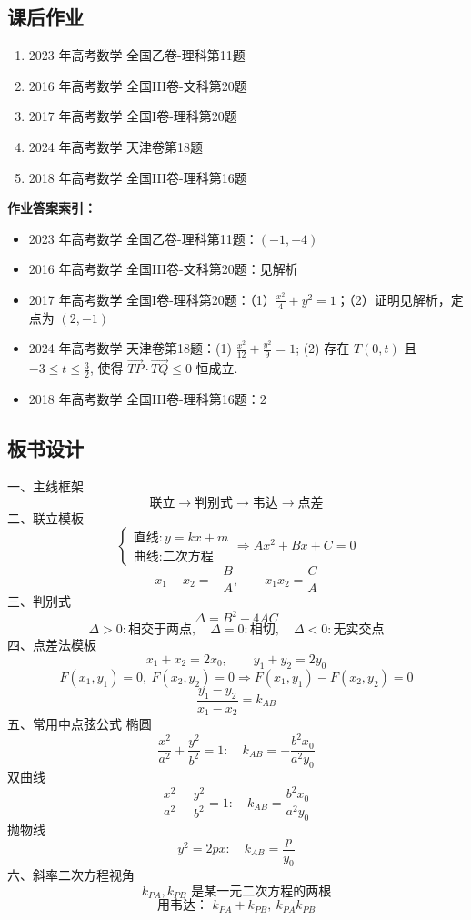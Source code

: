 \documentclass[UTF8,a4paper,11pt]{ctexart}
\begin{document}
\subsection*{课后作业}

\begin{enumerate}

\item 2023 年高考数学 全国乙卷-理科第11题

\item 2016 年高考数学 全国III卷-文科第20题

\item 2017 年高考数学 全国I卷-理科第20题

\item 2024 年高考数学 天津卷第18题

\item 2018 年高考数学 全国III卷-理科第16题

\end{enumerate}

\noindent\textbf{作业答案索引：}

\begin{itemize}

\item 2023 年高考数学 全国乙卷-理科第11题：$(-1,-4)$

\item 2016 年高考数学 全国III卷-文科第20题：见解析

\item 2017 年高考数学 全国I卷-理科第20题：（1）$\frac{x^2}{4}+y^2=1$；（2）证明见解析，定点为 $(2,-1)$

\item 2024 年高考数学 天津卷第18题：(1) $\frac{x^2}{12}+\frac{y^2}{9}=1$; (2) 存在 $T(0,t)$ 且 $-3\leq t\leq \frac{3}{2}$, 使得 $\overrightarrow{TP}\cdot\overrightarrow{TQ}\leq 0$ 恒成立.

\item 2018 年高考数学 全国III卷-理科第16题：$2$

\end{itemize}

\subsection*{板书设计}

一、主线框架\[\text{联立}\to\text{判别式}\to\text{韦达}\to\text{点差}\]
二、联立模板\[\begin{cases}
\text{直线}: y=kx+m\\
\text{曲线}: \text{二次方程}
\end{cases}\Rightarrow Ax^2+Bx+C=0\]\[x_1+x_2=-\frac{B}{A},\qquad x_1x_2=\frac{C}{A}\]
三、判别式\[\Delta=B^2-4AC\]\[\Delta>0:\text{相交于两点},\quad \Delta=0:\text{相切},\quad \Delta<0:\text{无实交点}\]
四、点差法模板\[x_1+x_2=2x_0,\qquad y_1+y_2=2y_0\]\[F(x_1,y_1)=0,\ F(x_2,y_2)=0\Rightarrow F(x_1,y_1)-F(x_2,y_2)=0\]\[\frac{y_1-y_2}{x_1-x_2}=k_{AB}\]
五、常用中点弦公式
椭圆 \[\frac{x^2}{a^2}+\frac{y^2}{b^2}=1:\quad k_{AB}=-\frac{b^2x_0}{a^2y_0}\]
双曲线 \[\frac{x^2}{a^2}-\frac{y^2}{b^2}=1:\quad k_{AB}=\frac{b^2x_0}{a^2y_0}\]
抛物线 \[y^2=2px:\quad k_{AB}=\frac{p}{y_0}\]
六、斜率二次方程视角\[k_{PA},k_{PB}\text{ 是某一元二次方程的两根}\]\[\text{用韦达： }k_{PA}+k_{PB},\ k_{PA}k_{PB}\]
\end{document}
